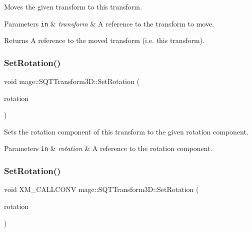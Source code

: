 Moves the given transform to this transform.


\begin{DoxyParams}[1]{Parameters}
\mbox{\tt in}  & {\em transform} & A reference to the transform to move. \\
\hline
\end{DoxyParams}
\begin{DoxyReturn}{Returns}
A reference to the moved transform (i.\+e. this transform). 
\end{DoxyReturn}
\mbox{\label{classmage_1_1_s_q_t_transform3_d_a63dfbd5a54920f65922bb3198043a79c}} 
\subsubsection{\texorpdfstring{Set\+Rotation()}{SetRotation()}\hspace{0.1cm}{\footnotesize\ttfamily [1/2]}}
{\footnotesize\ttfamily void mage\+::\+S\+Q\+T\+Transform3\+D\+::\+Set\+Rotation (\begin{DoxyParamCaption}\item[{const \mbox{\hyperlink{namespacemage_a851648f37dfb126a2d2f973e102861ad}{F32x4}} \&}]{rotation }\end{DoxyParamCaption})\hspace{0.3cm}{\ttfamily [noexcept]}}

Sets the rotation component of this transform to the given rotation component.


\begin{DoxyParams}[1]{Parameters}
\mbox{\tt in}  & {\em rotation} & A reference to the rotation component. \\
\hline
\end{DoxyParams}
\mbox{\label{classmage_1_1_s_q_t_transform3_d_aab4a582724596a859f5c338dcc9205d4}} 
\subsubsection{\texorpdfstring{Set\+Rotation()}{SetRotation()}\hspace{0.1cm}{\footnotesize\ttfamily [2/2]}}
{\footnotesize\ttfamily void X\+M\+\_\+\+C\+A\+L\+L\+C\+O\+NV mage\+::\+S\+Q\+T\+Transform3\+D\+::\+Set\+Rotation (\begin{DoxyParamCaption}\item[{F\+X\+M\+V\+E\+C\+T\+OR}]{rotation }\end{DoxyParamCaption})\hspace{0.3cm}{\ttfamily [noexcept]}}

